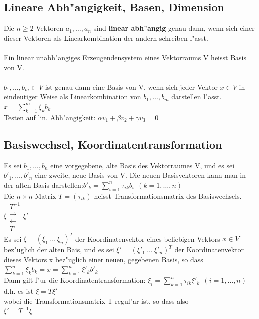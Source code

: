 \documentclass[10pt, a4paper, twocolumn]{scrartcl}
\begin{document}
\subsection{Lineare Abh"angigkeit, Basen, Dimension}

Die $n\geq 2$ Vektoren $a_1,\ldots,a_n$ sind {\bf linear abh"angig} genau dann, wenn sich einer dieser Vektoren als Linearkombination der andern schreiben l"asst.\\\\

Ein linear unabh"angiges Erzeugendensystem eines Vektorraums V heisst Basis von V.\\\\

${b_1,\ldots,b_m}\subset V$ ist genau dann eine Basis von V, wenn sich jeder Vektor $x \in V$ in eindeutiger Weise als Linearkombination von $b_1,\ldots,b_m$ darstellen l"asst. $x=\sum^m_{k=1}\xi_k b_k$\\

Testen auf lin. Abh"angigkeit: $\alpha v_1 +\beta v_2 +\gamma v_3=0$ 


\subsection{Basiswechsel, Koordinatentransformation}

Es sei ${b_1,\ldots,b_n}$ eine vorgegebene, alte Basis des Vektorraumes V, und es sei ${b'_1,\ldots,b'_n}$ eine zweite, neue Basis von V. Die neuen Basisvektoren kann man in der alten Basis darstellen:$b'_k=\sum^n_{i=1}\tau_{ik}b_i\:\: (k=1,\ldots,n)$\\

Die $n \times n$-Matrix $T = (\tau_{ik})$ heisst Transformationsmatrix des Basiswechsels.\\
$
\left. \xi
\begin{array}{c}
 T^{-1}\\
 \rightarrow\\
 \leftarrow\\
 T
\end{array}
\xi' \right.
$\\

Es sei $\xi=(\xi_1\:\ldots\:\xi_n)^T$ der Koordinatenvektor eines beliebigen Vektors $x \in V$ bez"uglich der alten Bais, und es sei $\xi'=(\xi'_1\:\ldots\:\xi'_n)^T$ der Koordinatenvektor dieses Vektors x bez"uglich einer neuen, gegebenen Basis, so dass\\
$\sum^n_{k=1}\xi_k b_k=x=\sum^n_{k=1}\xi'_kb'_k$\\
Dann gilt f"ur die Koordinatentransformation:
$\xi_i=\sum^n_{k=1}\tau_{ik}\xi'_k\:\:(i=1,\ldots,n)$\\
d.h. es ist $\xi=T\xi'$\\
wobei die Transformationsmatrix T regul"ar ist, so dass also\\
$\xi'=T^{-1}\xi$
\end{document}

